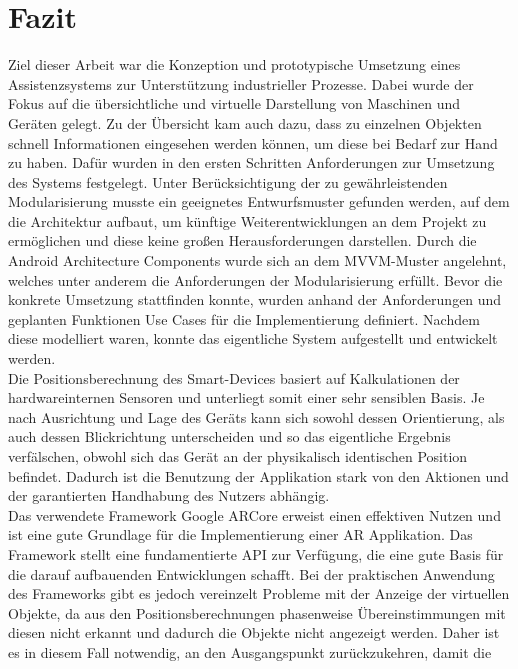 \chapter{Fazit}
\label{chap:Fazit}
Ziel dieser Arbeit war die Konzeption und prototypische Umsetzung eines Assistenzsystems zur Unterstützung industrieller Prozesse. Dabei wurde der Fokus auf die 
übersichtliche und virtuelle Darstellung von Maschinen und Geräten gelegt. Zu der Übersicht kam auch dazu, dass zu einzelnen Objekten schnell Informationen eingesehen 
werden können, um diese bei Bedarf zur Hand zu haben. Dafür wurden in den ersten Schritten Anforderungen zur Umsetzung des Systems festgelegt. Unter Berücksichtigung der 
zu gewährleistenden Modularisierung musste ein geeignetes Entwurfsmuster gefunden werden, auf dem die Architektur aufbaut, um künftige Weiterentwicklungen an dem Projekt 
zu ermöglichen und diese keine großen Herausforderungen darstellen. Durch die Android Architecture Components wurde sich an dem MVVM-Muster angelehnt, welches unter anderem 
die Anforderungen der Modularisierung erfüllt. Bevor die konkrete Umsetzung stattfinden konnte, wurden anhand der Anforderungen und geplanten Funktionen Use Cases für die 
Implementierung definiert. Nachdem diese modelliert waren, konnte das eigentliche System aufgestellt und entwickelt werden.
\\ 
\linebreak
Die Positionsberechnung des Smart-Devices basiert auf Kalkulationen der hardwareinternen Sensoren und unterliegt somit einer sehr sensiblen Basis. Je nach Ausrichtung und 
Lage des Geräts kann sich sowohl dessen Orientierung, als auch dessen Blickrichtung unterscheiden und so das eigentliche Ergebnis verfälschen, obwohl sich das Gerät an der physikalisch 
identischen Position befindet. Dadurch ist die Benutzung der Applikation stark von den Aktionen und der garantierten Handhabung des Nutzers abhängig. 
\\ 
\linebreak
Das verwendete Framework Google ARCore erweist einen effektiven Nutzen und ist eine gute Grundlage für die Implementierung einer \acl{AR} Applikation. Das 
Framework stellt eine fundamentierte \acs{API} zur Verfügung, die eine gute Basis für die darauf aufbauenden Entwicklungen schafft. Bei der praktischen 
Anwendung des Frameworks gibt es jedoch vereinzelt Probleme mit der Anzeige der virtuellen Objekte, da aus den Positionsberechnungen phasenweise Übereinstimmungen mit diesen 
nicht erkannt und dadurch die Objekte nicht angezeigt werden. Daher ist es in diesem Fall notwendig, an den Ausgangspunkt zurückzukehren, damit die 
